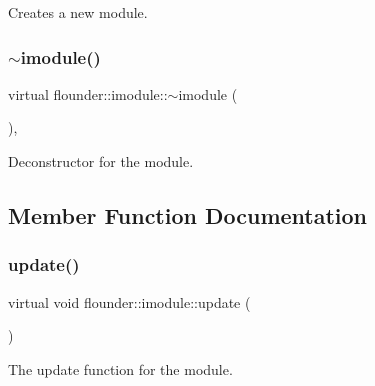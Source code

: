 Creates a new module. 

\mbox{\label{classflounder_1_1imodule_a519b8530d27d6c21d591e12e776ef834}} 
\subsubsection{\texorpdfstring{$\sim$imodule()}{~imodule()}}
{\footnotesize\ttfamily virtual flounder\+::imodule\+::$\sim$imodule (\begin{DoxyParamCaption}{ }\end{DoxyParamCaption})\hspace{0.3cm}{\ttfamily [inline]}, {\ttfamily [virtual]}}



Deconstructor for the module. 



\subsection{Member Function Documentation}
\mbox{\label{classflounder_1_1imodule_a9a53d48a46b5f6b16a92b2cd8503f74a}} 
\subsubsection{\texorpdfstring{update()}{update()}}
{\footnotesize\ttfamily virtual void flounder\+::imodule\+::update (\begin{DoxyParamCaption}{ }\end{DoxyParamCaption})\hspace{0.3cm}{\ttfamily [pure virtual]}}



The update function for the module. 



